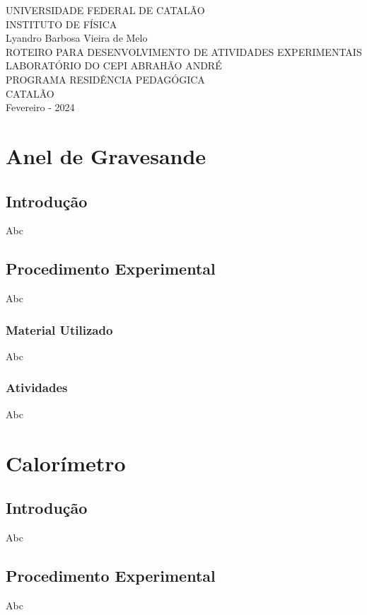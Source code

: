 \documentclass[12pt,a4paper]{article}
\begin{document}
	\begin{titlepage}
		\begin{center}
			UNIVERSIDADE FEDERAL DE CATALÃO\\
			INSTITUTO DE FÍSICA\\\vspace{5cm}
			Lyandro Barbosa Vieira de Melo\\\vspace{4cm}
			ROTEIRO PARA DESENVOLVIMENTO DE ATIVIDADES EXPERIMENTAIS\\
			LABORATÓRIO DO CEPI ABRAHÃO ANDRÉ\\\vspace{4cm}
			PROGRAMA RESIDÊNCIA PEDAGÓGICA\\\vspace{7cm}
			CATALÃO\\
			Fevereiro - 2024
		\end{center}
	\end{titlepage}

	\tableofcontents

	\clearpage

	\section{Anel de Gravesande}
		\subsection{Introdução}
		Abc
		\subsection{Procedimento Experimental}
		Abc
		\subsubsection{Material Utilizado}
		Abc
		\subsubsection{Atividades}
		Abc
	\section{Calorímetro}
		\subsection{Introdução}
		Abc
		\subsection{Procedimento Experimental}
		Abc
\end{document}

